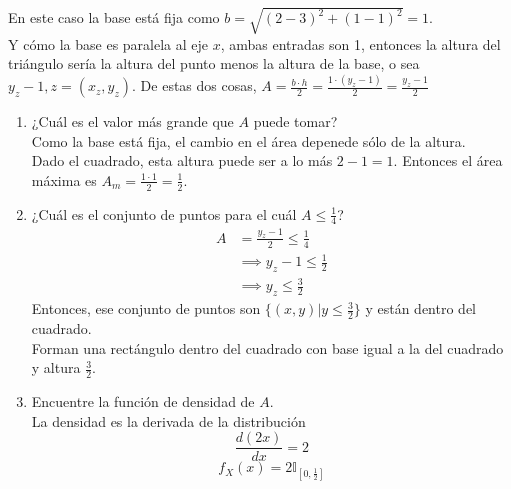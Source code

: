 \documentclass[12pt,a4paper]{report}
\begin{document}
\begin{enumerate}
{			En este caso la base está fija como $b = \sqrt{(2-3)^2+(1-1)^2} = 1$.\\
			Y cómo la base es paralela al eje $x$, ambas entradas son 1,
			entonces la altura del triángulo sería la altura del punto menos la
			altura de la base, o sea $y_z-1, z = (x_z, y_z)$.
			De estas dos cosas, $A = \frac{b \cdot h}{2} = \frac{1 \cdot(y_z-1)}{2}
			= \frac{y_z-1}{2}$
			\begin{enumerate}
				\item {
					¿Cuál es el valor más grande que $A$ puede tomar?\\
					Como la base está fija, el cambio en el área depenede sólo
					de la altura.\\
					Dado el cuadrado, esta altura puede ser a lo más $2-1 = 1$.
					Entonces el área máxima es $A_m = \frac{1\cdot 1}{2} = \frac{1}{2}$.
				}
				\item {
					¿Cuál es el conjunto de puntos para el cuál $A \leq \frac{1}{4}$?
					\begin{align*}
						A &= \frac{y_z-1}{2} \leq \frac{1}{4}\\
						  &\implies y_z-1 \leq \frac{1}{2}\\
						  &\implies y_z \leq \frac{3}{2}
					\end{align*}
					Entonces, ese conjunto de puntos son $\{(x, y) | y \leq \frac{3}{2}\}$
					y están dentro del cuadrado.\\
					Forman una rectángulo dentro del cuadrado con base igual a
					la del cuadrado y altura $\frac{3}{2}$.
				}
				\item {
					Encuentre la función de densidad de $A$.\\
					La densidad es la derivada de la distribución
					\[\frac{d(2x)}{dx} = 2\]
					\[f_X(x) = 2 \mathbb{I}_{[0, \frac{1}{2}]}\]

}
\end{enumerate}}
\end{enumerate}
\end{document}
